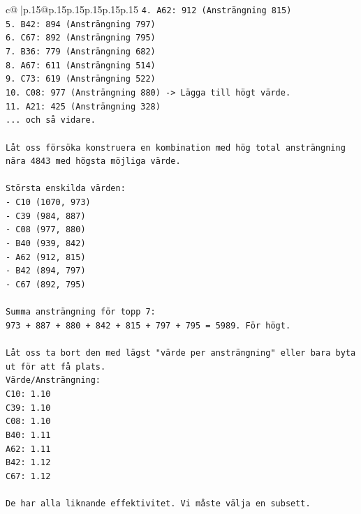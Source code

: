 \documentclass{article}
\begin{document}
{\begin{supertabular}{c@{$\;$}|p{.15\linewidth}@{}p{.15\linewidth}p{.15\linewidth}p{.15\linewidth}p{.15\linewidth}p{.15\linewidth}}
{{{\texttt{4. A62: 912 (Ansträngning 815)} \\
\texttt{5. B42: 894 (Ansträngning 797)} \\
\texttt{6. C67: 892 (Ansträngning 795)} \\
\texttt{7. B36: 779 (Ansträngning 682)} \\
\texttt{8. A67: 611 (Ansträngning 514)} \\
\texttt{9. C73: 619 (Ansträngning 522)} \\
\texttt{10. C08: 977 (Ansträngning 880) {-}> Lägga till högt värde.} \\
\texttt{11. A21: 425 (Ansträngning 328)} \\
\texttt{... och så vidare.} \\
\\ 
\texttt{Låt oss försöka konstruera en kombination med hög total ansträngning nära 4843 med högsta möjliga värde.} \\
\\ 
\texttt{Största enskilda värden:} \\
\texttt{{-} C10 (1070, 973)} \\
\texttt{{-} C39 (984, 887)} \\
\texttt{{-} C08 (977, 880)} \\
\texttt{{-} B40 (939, 842)} \\
\texttt{{-} A62 (912, 815)} \\
\texttt{{-} B42 (894, 797)} \\
\texttt{{-} C67 (892, 795)} \\
\\ 
\texttt{Summa ansträngning för topp 7:} \\
\texttt{973 + 887 + 880 + 842 + 815 + 797 + 795 = 5989. För högt.} \\
\\ 
\texttt{Låt oss ta bort den med lägst "värde per ansträngning" eller bara byta ut för att få plats.} \\
\texttt{Värde/Ansträngning:} \\
\texttt{C10: 1.10} \\
\texttt{C39: 1.10} \\
\texttt{C08: 1.10} \\
\texttt{B40: 1.11} \\
\texttt{A62: 1.11} \\
\texttt{B42: 1.12} \\
\texttt{C67: 1.12} \\
\\ 
\texttt{De har alla liknande effektivitet. Vi måste välja en subsett.} \\
}}}
\end{supertabular}}
\end{document}
